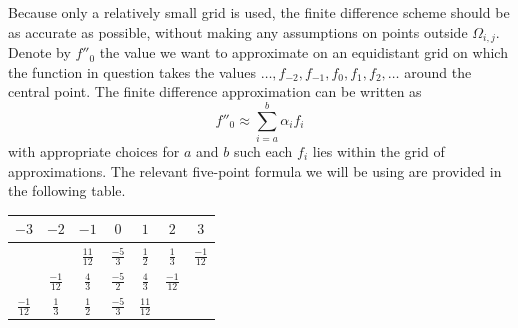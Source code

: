 Because only a relatively small grid is used, the finite difference scheme should be as accurate as possible, without making any assumptions on points outside $\Omega_{i,j}$. Denote by $f''_0$ the value we want to approximate on an equidistant grid on which the function in question takes the values $\dots, f_{-2}, f_{-1}, f_{0}, f_{1}, f_{2}, \dots$ around the central point. The finite difference approximation can be written as
$$
    f''_0 \approx \sum_{i = a}^{b} \alpha_i f_i
$$
with appropriate choices for $a$ and $b$ such each $f_i$ lies within the grid of approximations. The relevant five-point formula we will be using are provided in the following table.

\begin{center}
    \begin{tabular}{@{}ccc|c|ccc@{}}
        $-3$                               & $-2$            & $-1$            & $0$            & $1$             & $2$             & $3$             \\ \hline
        \rule{0pt}{3ex}                    &                 & $\frac{11}{12}$ & $\frac{-5}{3}$ & $\frac{1}{2}$   & $\frac{1}{3}$   & $\frac{-1}{12}$ \\
        \rule{0pt}{3ex}                    & $\frac{-1}{12}$ & $\frac{4}{3}$   & $\frac{-5}{2}$ & $\frac{4}{3}$   & $\frac{-1}{12}$ &                 \\
        \rule{0pt}{3ex}    $\frac{-1}{12}$ & $\frac{1}{3}$   & $\frac{1}{2}$   & $\frac{-5}{3}$ & $\frac{11}{12}$ &                 &
    \end{tabular}
\end{center}

